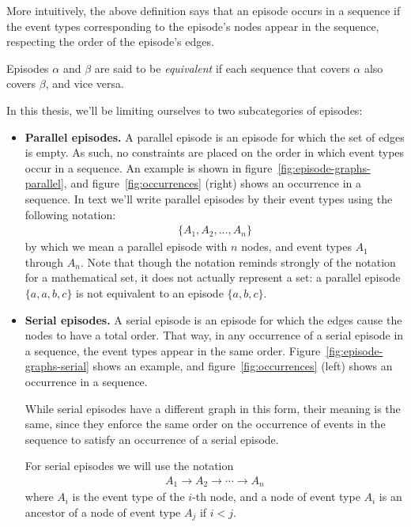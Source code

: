 More intuitively, the above definition says that an episode occurs in a sequence if the event types corresponding to the episode's nodes appear in the sequence, respecting the order of the episode's edges.

\begin{definition}
Episodes $ \alpha $ and $ \beta $ are said to be \emph{equivalent} if each sequence that covers $ \alpha $ also covers $ \beta $, and vice versa.
\end{definition}

In this thesis, we'll be limiting ourselves to two subcategories of episodes:
\begin{itemize}
\item \textbf{Parallel episodes.} A parallel episode is an episode for which the set of edges is empty. As such, no constraints are placed on the order in which event types occur in a sequence. An example is shown in figure~\ref{fig:episode-graphs-parallel}, and figure~\ref{fig:occurrences} (right) shows an occurrence in a sequence. In text we'll write parallel episodes by their event types using the following notation:
\begin{align*}
    \{ A_1, A_2, \ldots, A_n \}
\end{align*}
by which we mean a parallel episode with $ n $ nodes, and event types $ A_1 $ through $ A_n $. Note that though the notation reminds strongly of the notation for a mathematical set, it does not actually represent a set: a parallel episode $ \{ a, a, b, c \} $ is not equivalent to an episode $ \{ a, b, c \} $.

\item \textbf{Serial episodes.} A serial episode is an episode for which the edges cause the nodes to have a total order. That way, in any occurrence of a serial episode in a sequence, the event types appear in the same order. Figure~\ref{fig:episode-graphs-serial} shows an example, and figure~\ref{fig:occurrences} (left) shows an occurrence in a sequence.


While serial episodes have a different graph in this form, their meaning is the same, since they enforce the same order on the occurrence of events in the sequence to satisfy an occurrence of a serial episode.

For serial episodes we will use the notation
\begin{align*}
    A_1 \to A_2 \to \cdots \to A_n
\end{align*}
where $ A_i $ is the event type of the $ i $-th node, and a node of event type $ A_i $ is an ancestor of a node of event type $ A_j $ if $ i < j $.

\end{itemize}

